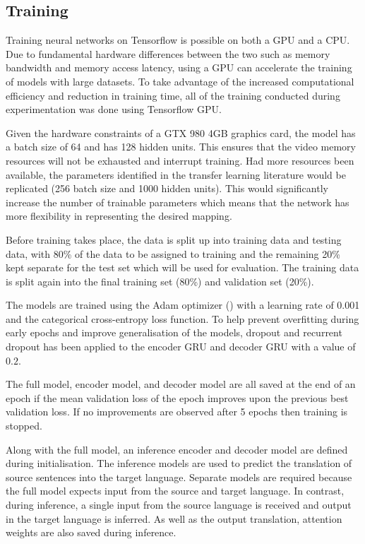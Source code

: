 \subsection{Training}
Training neural networks on Tensorflow is possible on both a GPU and a CPU. Due to fundamental hardware differences between the two such as memory bandwidth and memory access latency, using a GPU can accelerate the training of models with large datasets. To take advantage of the increased computational efficiency and reduction in training time, all of the training conducted during experimentation was done using Tensorflow GPU.

Given the hardware constraints of a GTX 980 4GB graphics card, the model has a batch size of 64 and has 128 hidden units. This ensures that the video memory resources will not be exhausted and interrupt training. Had more resources been available, the parameters identified in the transfer learning literature would be replicated (256 batch size and 1000 hidden units). This would significantly increase the number of trainable parameters which means that the network has more flexibility in representing the desired mapping.

Before training takes place, the data is split up into training data and testing data, with 80\% of the data to be assigned to training and the remaining 20\% kept separate for the test set which will be used for evaluation. The training data is split again into the final training set (80\%) and validation set (20\%).

The models are trained using the Adam optimizer (\cite{adam_optimizer_2014}) with a learning rate of 0.001 and the categorical cross-entropy loss function. To help prevent overfitting during early epochs and improve generalisation of the models, dropout and recurrent dropout has been applied to the encoder \acrshort{GRU} and decoder \acrshort{GRU} with a value of $0.2$. 

The full model, encoder model, and decoder model are all saved at the end of an epoch if the mean validation loss of the epoch improves upon the previous best validation loss. If no improvements are observed after 5 epochs then training is stopped.


Along with the full model, an inference encoder and decoder model are defined during initialisation. The inference models are used to predict the translation of source sentences into the target language. Separate models are required because the full model expects input from the source and target language. In contrast, during inference, a single input from the source language is received and output in the target language is inferred. As well as the output translation, attention weights are also saved during inference.

